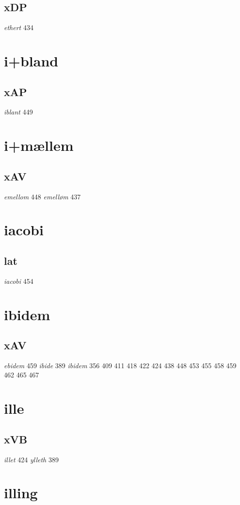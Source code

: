 \documentclass[a4paper,twocolumn]{article}
\begin{document}
\subsection{xDP}
\label{sec:org28ea000}
\emph{ethert} 434 
\section{i+bland}
\label{sec:org273fb57}
\subsection{xAP}
\label{sec:org93e0e1f}
\emph{iblant} 449 
\section{i+mællem}
\label{sec:orgec6c049}
\subsection{xAV}
\label{sec:orgd5a11fb}
\emph{emellom} 448 \emph{emelløm} 437 
\section{iacobi}
\label{sec:orgb8d0f74}
\subsection{lat}
\label{sec:orgcd8fbb0}
\emph{iacobi} 454 
\section{ibidem}
\label{sec:org47dd836}
\subsection{xAV}
\label{sec:org28d7c96}
\emph{ebidem} 459 \emph{ibide} 389 \emph{ibidem} 356 409 411 418 422 424 438 448 453 455 458 459 462 465 467 
\section{ille}
\label{sec:org6eebd28}
\subsection{xVB}
\label{sec:org1f00488}
\emph{illet} 424 \emph{ylleth} 389 
\section{illing}
\label{sec:orgfb380c3}
\end{document}
